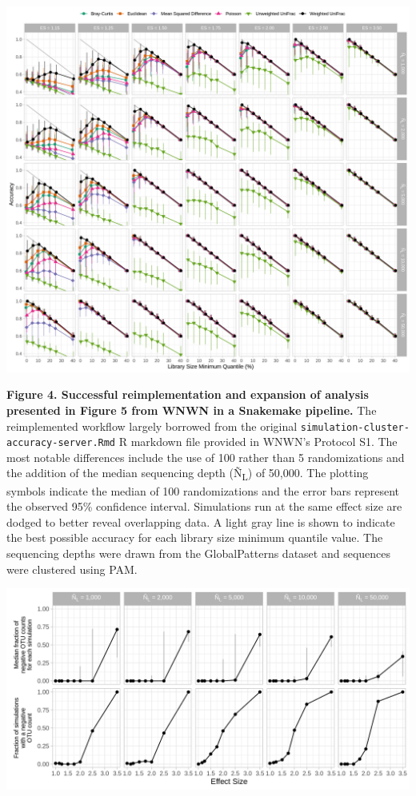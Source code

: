 \documentclass[
]{article}
\begin{document}
\includegraphics{figure_04.png}

\textbf{Figure 4. Successful reimplementation and expansion of analysis
presented in Figure 5 from WNWN in a Snakemake pipeline.} The
reimplemented workflow largely borrowed from the original
\texttt{simulation-cluster-accuracy-server.Rmd} R markdown file provided
in WNWN's Protocol S1. The most notable differences include the use of
100 rather than 5 randomizations and the addition of the median
sequencing depth (Ñ\textsubscript{L}) of 50,000. The plotting symbols
indicate the median of 100 randomizations and the error bars represent
the observed 95\% confidence interval. Simulations run at the same
effect size are dodged to better reveal overlapping data. A light gray
line is shown to indicate the best possible accuracy for each library
size minimum quantile value. The sequencing depths were drawn from the
GlobalPatterns dataset and sequences were clustered using PAM.

\newpage

\includegraphics{figure_05.png}
\end{document}
